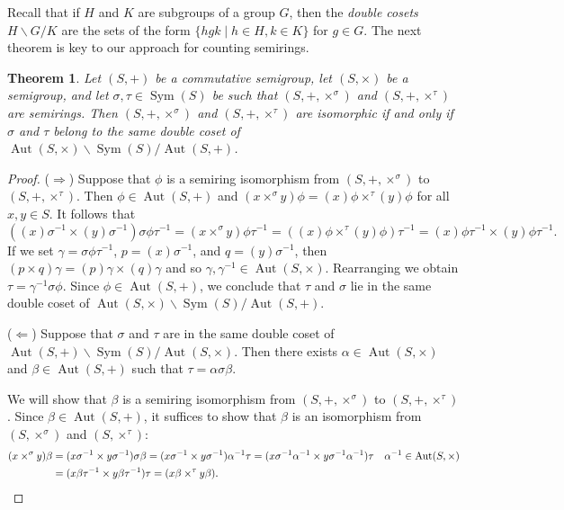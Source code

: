\documentclass{article}
\theoremstyle{definition}
\theoremstyle{plain}
\newtheorem{theorem}[defn]{Theorem}
\newcommand{\Sym}{\operatorname{Sym}}
\newcommand{\Aut}{\operatorname{Aut}}
\begin{document}
Recall that if $H$ and $K$ are subgroups of a group $G$, then the
\textit{double cosets} $H\backslash G / K$ are the sets of the form
$\{hgk\mid h\in H, k \in K\}$ for $g\in G$.
The next theorem is key to our approach for counting semirings.

\begin{theorem}
  \label{thm:isomorphism-condition}
  Let \((S, +)\) be a commutative semigroup, let \((S, \times)\) be a semigroup,
  and let \(\sigma, \tau\in\Sym(S)\) be such that $(S, +, \times ^ \sigma)$ and
  $(S, +, \times ^ \tau)$ are semirings.
  Then \((S, +, \times ^ \sigma)\) and \((S, +, \times^\tau)\) are isomorphic
  if and only if \(\sigma\) and \(\tau\) belong to the same double coset of
  \(\Aut(S, \times) \backslash \Sym(S) / \Aut(S, +)\).
\end{theorem}

\begin{proof}
  ($\Rightarrow$) Suppose that $\phi$ is a semiring isomorphism from
  $(S, +, \times ^ \sigma)$ to $(S, +, \times^\tau)$. Then
  $\phi \in \Aut(S, +)$ and $(x \times ^ \sigma y)\phi = (x)\phi\times ^ \tau
  (y)\phi$ for all $x, y\in S$. It follows that
  \[
    ((x)\sigma ^ {-1} \times (y)\sigma ^ {-1})\sigma \phi \tau ^ {-1} =
    (x \times ^ \sigma y)\phi\tau ^ {-1}
    = ((x)\phi \times ^ {\tau} (y)\phi)\tau ^ {-1}
    = (x)\phi\tau ^ {-1} \times (y)\phi\tau ^ {-1}.
  \]
  If we set $\gamma = \sigma\phi\tau^{-1}$, $p =
  (x)\sigma^{-1}$, and $q=(y)\sigma^{-1}$, then
  $(p\times q)\gamma = (p)\gamma \times (q)\gamma$
  and so $\gamma, \gamma ^ {-1} \in \Aut(S, \times)$.
  Rearranging we obtain $\tau = \gamma^{-1}\sigma\phi$. Since $\phi \in
  \Aut(S, +)$, we conclude that $\tau$ and $\sigma$ lie in the
  same double coset of $\Aut(S, \times) \backslash \Sym(S) / \Aut(S, +)$.

  ($\Leftarrow$) Suppose that $\sigma$ and $\tau$ are in the
  same double coset of $\Aut(S, +) \backslash \Sym(S) / \Aut(S, \times)$.
  Then there exists $\alpha\in\Aut(S, \times)$ and $\beta\in\Aut(S, +)$ such
  that $\tau=\alpha\sigma\beta$.

  We will show that $\beta$ is a semiring isomorphism from $(S, +, \times
  ^{\sigma})$ to $(S, +, \times^{\tau})$. Since $\beta\in \Aut(S, +)$, it
  suffices to show that $\beta$ is an isomorphism from $(S, \times
  ^{\sigma})$ and $(S, \times^{\tau})$:
  \begin{align*}
    (x\times^\sigma y)\beta
    &= (x\sigma ^{-1} \times y\sigma ^{-1})\sigma \beta
    = (x\sigma ^{-1} \times y\sigma ^{-1})\alpha^{-1}\tau
    = (x\sigma ^{-1}\alpha^{-1} \times y\sigma ^{-1}\alpha^{-1})\tau &&
    \alpha^{-1} \in \Aut(S, \times)\\
    &= (x\beta\tau^{-1} \times y\beta\tau^{-1})\tau
    = (x\beta \times^{\tau} y\beta).\qedhere
  \end{align*}
\end{proof}
\end{document}

